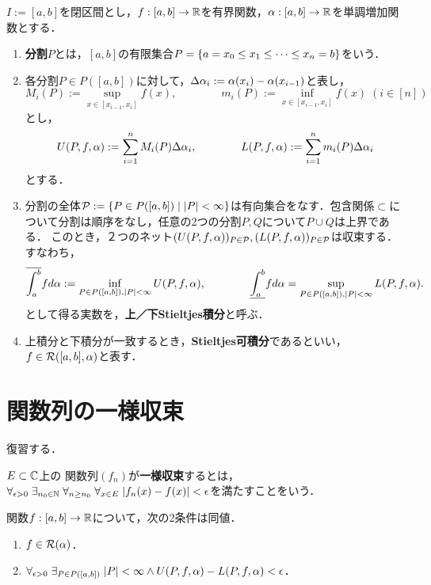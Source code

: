 \documentclass[uplatex, dvipdfmx]{jsreport}
\begin{document}
\begin{definition}
    $I:=[a,b]$を閉区間とし，$f:[a,b]\to\mathbb{R}$を有界関数，$\alpha:[a,b]\to\mathbb{R}$を単調増加関数とする．
    \begin{enumerate}
        \item \textbf{分割}$P$とは，$[a,b]$の有限集合$P=\left\{a=x_0\le x_1\le\cdots\le x_n=b\right\}$をいう．
        \item 各分割$P\in P([a,b])$に対して，$\Delta\alpha_i:=\alpha(x_i)-\alpha(x_{i-1})$と表し，
        \[M_i(P):=\sup_{x\in[x_{i-1},x_i]}f(x),\qquad\qquad m_i(P):=\inf_{x\in[x_{i-1},x_i]}f(x)\;(i\in[n])\]
        とし，
        \[U(P,f,\alpha):=\sum^n_{i=1}M_i(P)\Delta\alpha_i,\qquad\qquad L(P,f,\alpha):=\sum^n_{i=1}m_i(P)\Delta\alpha_i\]
        とする．
        \item 分割の全体$\mathcal{P}:=\left\{P\in P([a,b])\mid\lvert P\rvert<\infty\right\}$は有向集合をなす．包含関係$\subset$について分割は順序をなし，任意の2つの分割$P,Q$について$P\cup Q$は上界である．
        このとき，２つのネット$(U(P,f,\alpha))_{P\in\mathcal{P}},(L(P,f,\alpha))_{P\in\mathcal{P}}$は収束する．
        すなわち，
        \[\overline{\int^b_a}fd\alpha:=\inf_{P\in P([a,b]),\lvert P\rvert<\infty}U(P,f,\alpha),\qquad\qquad\underline{\int^b_a}fd\alpha=\sup_{P\in P([a,b]),\lvert P\rvert<\infty}L(P,f,\alpha).\]
        として得る実数を，\textbf{上／下Stieltjes積分}と呼ぶ．
        \item 上積分と下積分が一致するとき，\textbf{Stieltjes可積分}であるといい，$f\in\mathcal{R}([a,b],\alpha)$と表す．
    \end{enumerate}
\end{definition}

\section{関数列の一様収束}

\begin{tcolorbox}[colframe=ForestGreen, colback=ForestGreen!10!white,breakable,colbacktitle=ForestGreen!40!white,coltitle=black,fonttitle=\bfseries\sffamily,
title=]
    復習する．
\end{tcolorbox}

\begin{definition}
    $E\subset\mathbb{C}$上の
    関数列$(f_n)$が\textbf{一様収束}するとは，$\forall_{\epsilon>0}\;\exists_{n_0\in\mathbb{N}}\;\forall_{n\ge n_0}\;\forall_{x\in E}\;\lvert f_n(x)-f(x)\rvert<\epsilon$を満たすことをいう．
\end{definition}

\begin{theorem}[可積分性の特徴付け]
    関数$f:[a,b]\to\mathbb{R}$について，次の2条件は同値．
    \begin{enumerate}
        \item $f\in\mathcal{R}(\alpha)$．
        \item $\forall_{\epsilon>0}\;\exists_{P\in P([a,b])}\;\lvert P\rvert<\infty\land U(P,f,\alpha)-L(P,f,\alpha)<\epsilon$．
    \end{enumerate}
\end{theorem}
\end{document}
